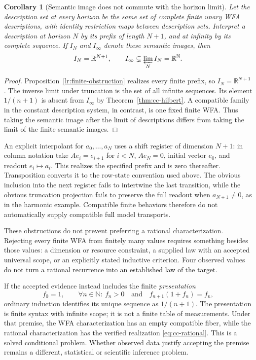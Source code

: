 \documentclass[11pt]{article}
\newtheorem{corollary}[theorem]{Corollary}
\theoremstyle{definition}
\begin{document}
\begin{corollary}[Semantic image does not commute with the horizon limit]
\label{thm:cc-finite-prefix}
Let the description set at every horizon be the same set of complete
finite unary WFA descriptions, with identity restriction maps between
description sets. Interpret a description at horizon $N$ by its prefix of
length $N+1$, and at infinity by its complete sequence. If $I_N$ and
$I_\infty$ denote these semantic images, then
\[
 I_N=\mathbb R^{N+1},\qquad
 I_\infty\subsetneq\varprojlim_N I_N=\mathbb R^{\mathbb N}.
\]
\end{corollary}
\begin{proof}
Proposition~\ref{lr:finite-obstruction} realizes every finite prefix,
so $I_N=\mathbb R^{N+1}$. The inverse limit under truncation is the set
of all infinite sequences. Its element $1/(n+1)$ is absent from
$I_\infty$ by Theorem~\ref{thm:cc-hilbert}. A compatible family in the
constant description system, in contrast, is one fixed finite WFA.
Thus taking the semantic image after the limit of descriptions differs
from taking the limit of the finite semantic images.
\end{proof}

An explicit interpolant for $a_0,\ldots,a_N$ uses a shift register of
dimension $N+1$: in column notation take $Ae_i=e_{i+1}$ for $i<N$,
$Ae_N=0$, initial vector $e_0$, and readout $e_i\mapsto a_i$.
This realizes the specified prefix and is zero thereafter. Transposition
converts it to the row-state convention used above. The obvious inclusion
into the next register fails to intertwine the last transition, while the
obvious truncation projection fails to preserve the full readout when
$a_{N+1}\ne0$, as in the harmonic example. Compatible finite behaviors
therefore do not automatically supply compatible full model transports.

These obstructions do not prevent preferring a rational characterization.
Rejecting every finite WFA from finitely many values requires
something besides those values: a dimension or resource constraint, a supplied
law with an accepted universal scope, or an explicitly stated inductive
criterion. Four observed values do not turn a rational recurrence into an
established law of the target.

If the accepted evidence instead includes the finite \emph{presentation}
\[
 f_0=1,\qquad
 \forall n\in\mathbb N:\ f_n>0\quad\text{and}\quad
 f_{n+1}(1+f_n)=f_n,
\]
ordinary induction identifies its unique sequence as $1/(n+1)$. The
presentation is finite syntax with infinite scope; it is not a finite table
of measurements. Under that premise, the WFA characterization has an empty
compatible fiber, while the rational characterization has the verified
realization \eqref{eq:cc-rational}. This is a solved conditional problem.
Whether observed data justify accepting the premise remains a different,
statistical or scientific inference problem.
\end{document}
